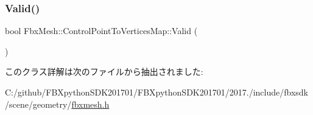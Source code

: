 \mbox{\label{class_fbx_mesh_1_1_control_point_to_vertices_map_af5295f57570dd004f1e574fdc96e2257}} 
\subsubsection{\texorpdfstring{Valid()}{Valid()}}
{\footnotesize\ttfamily bool Fbx\+Mesh\+::\+Control\+Point\+To\+Vertices\+Map\+::\+Valid (\begin{DoxyParamCaption}{ }\end{DoxyParamCaption})}



このクラス詳解は次のファイルから抽出されました\+:\begin{DoxyCompactItemize}
\item 
C\+:/github/\+F\+B\+Xpython\+S\+D\+K201701/\+F\+B\+Xpython\+S\+D\+K201701/2017./include/fbxsdk/scene/geometry/\hyperlink{fbxmesh_8h}{fbxmesh.\+h}\end{DoxyCompactItemize}
